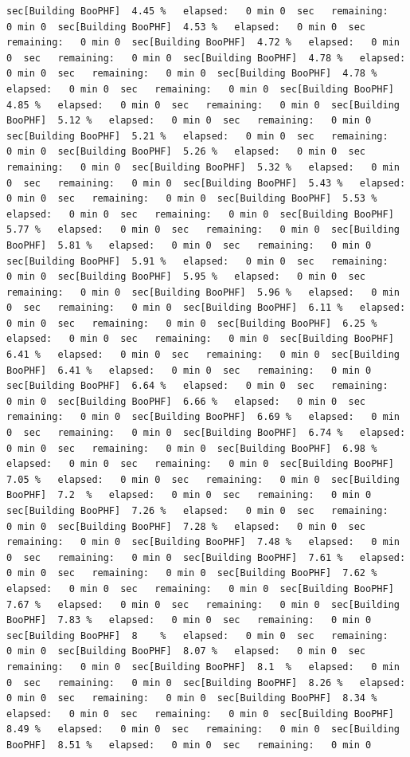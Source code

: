 \documentclass[
]{book}
\begin{document}
\begin{verbatim}
sec[Building BooPHF]  4.45 %   elapsed:   0 min 0  sec   remaining:   0 min 0  sec[Building BooPHF]  4.53 %   elapsed:   0 min 0  sec   remaining:   0 min 0  sec[Building BooPHF]  4.72 %   elapsed:   0 min 0  sec   remaining:   0 min 0  sec[Building BooPHF]  4.78 %   elapsed:   0 min 0  sec   remaining:   0 min 0  sec[Building BooPHF]  4.78 %   elapsed:   0 min 0  sec   remaining:   0 min 0  sec[Building BooPHF]  4.85 %   elapsed:   0 min 0  sec   remaining:   0 min 0  sec[Building BooPHF]  5.12 %   elapsed:   0 min 0  sec   remaining:   0 min 0  sec[Building BooPHF]  5.21 %   elapsed:   0 min 0  sec   remaining:   0 min 0  sec[Building BooPHF]  5.26 %   elapsed:   0 min 0  sec   remaining:   0 min 0  sec[Building BooPHF]  5.32 %   elapsed:   0 min 0  sec   remaining:   0 min 0  sec[Building BooPHF]  5.43 %   elapsed:   0 min 0  sec   remaining:   0 min 0  sec[Building BooPHF]  5.53 %   elapsed:   0 min 0  sec   remaining:   0 min 0  sec[Building BooPHF]  5.77 %   elapsed:   0 min 0  sec   remaining:   0 min 0  sec[Building BooPHF]  5.81 %   elapsed:   0 min 0  sec   remaining:   0 min 0  sec[Building BooPHF]  5.91 %   elapsed:   0 min 0  sec   remaining:   0 min 0  sec[Building BooPHF]  5.95 %   elapsed:   0 min 0  sec   remaining:   0 min 0  sec[Building BooPHF]  5.96 %   elapsed:   0 min 0  sec   remaining:   0 min 0  sec[Building BooPHF]  6.11 %   elapsed:   0 min 0  sec   remaining:   0 min 0  sec[Building BooPHF]  6.25 %   elapsed:   0 min 0  sec   remaining:   0 min 0  sec[Building BooPHF]  6.41 %   elapsed:   0 min 0  sec   remaining:   0 min 0  sec[Building BooPHF]  6.41 %   elapsed:   0 min 0  sec   remaining:   0 min 0  sec[Building BooPHF]  6.64 %   elapsed:   0 min 0  sec   remaining:   0 min 0  sec[Building BooPHF]  6.66 %   elapsed:   0 min 0  sec   remaining:   0 min 0  sec[Building BooPHF]  6.69 %   elapsed:   0 min 0  sec   remaining:   0 min 0  sec[Building BooPHF]  6.74 %   elapsed:   0 min 0  sec   remaining:   0 min 0  sec[Building BooPHF]  6.98 %   elapsed:   0 min 0  sec   remaining:   0 min 0  sec[Building BooPHF]  7.05 %   elapsed:   0 min 0  sec   remaining:   0 min 0  sec[Building BooPHF]  7.2  %   elapsed:   0 min 0  sec   remaining:   0 min 0  sec[Building BooPHF]  7.26 %   elapsed:   0 min 0  sec   remaining:   0 min 0  sec[Building BooPHF]  7.28 %   elapsed:   0 min 0  sec   remaining:   0 min 0  sec[Building BooPHF]  7.48 %   elapsed:   0 min 0  sec   remaining:   0 min 0  sec[Building BooPHF]  7.61 %   elapsed:   0 min 0  sec   remaining:   0 min 0  sec[Building BooPHF]  7.62 %   elapsed:   0 min 0  sec   remaining:   0 min 0  sec[Building BooPHF]  7.67 %   elapsed:   0 min 0  sec   remaining:   0 min 0  sec[Building BooPHF]  7.83 %   elapsed:   0 min 0  sec   remaining:   0 min 0  sec[Building BooPHF]  8    %   elapsed:   0 min 0  sec   remaining:   0 min 0  sec[Building BooPHF]  8.07 %   elapsed:   0 min 0  sec   remaining:   0 min 0  sec[Building BooPHF]  8.1  %   elapsed:   0 min 0  sec   remaining:   0 min 0  sec[Building BooPHF]  8.26 %   elapsed:   0 min 0  sec   remaining:   0 min 0  sec[Building BooPHF]  8.34 %   elapsed:   0 min 0  sec   remaining:   0 min 0  sec[Building BooPHF]  8.49 %   elapsed:   0 min 0  sec   remaining:   0 min 0  sec[Building BooPHF]  8.51 %   elapsed:   0 min 0  sec   remaining:   0 min 0  
\end{verbatim}
\end{document}
